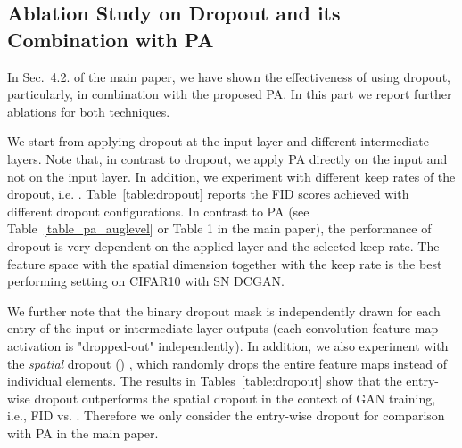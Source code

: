 \documentclass{article}
\begin{document}
\begin{center}
\subsection{Ablation Study on Dropout and its Combination with PA}\label{Ssubsec:dropout}
In Sec.~4.2. of the main paper, we have shown the effectiveness of using dropout, particularly, in combination with the proposed PA. In this part we report further ablations for both techniques.


We start from applying dropout at the input layer and different intermediate layers. Note that, in contrast to dropout, we apply PA directly on the input and not on the input layer. In addition, we experiment with different keep rates of the dropout, i.e. . Table~\ref{table:dropout} reports the FID scores achieved with different dropout configurations. In contrast to PA (see Table~\ref{table_pa_auglevel} or Table 1 in the main paper), the performance of dropout is very dependent on the applied layer and the selected keep rate. The feature space with the spatial dimension  together with the keep rate  is the best performing setting on CIFAR10 with SN DCGAN.

We further note that the binary dropout mask is independently drawn for each entry of the input or intermediate layer outputs (each convolution feature map activation is
"dropped-out" independently). In addition, we also experiment with the \emph{spatial} dropout () \cite{Tompson2015EfficientOL}, which randomly drops the entire feature maps instead of individual elements. The results in Tables~\ref{table:dropout} show that the entry-wise dropout outperforms the spatial dropout in the context of GAN training, i.e., FID  vs. . Therefore we only consider the entry-wise dropout for comparison with PA in the main paper.



\end{center}
\end{document}
